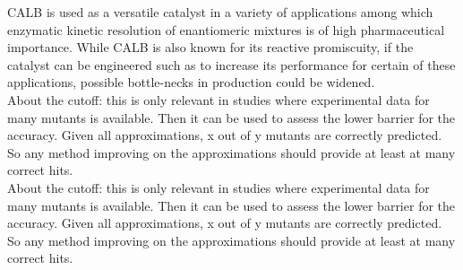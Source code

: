 CALB is used as a versatile catalyst in a variety of applications among which enzymatic kinetic resolution of enantiomeric mixtures is of high pharmaceutical importance\cite{gotor2006candida}.
While CALB is also known for its reactive promiscuity\cite{CBIC:CBIC200800318}, if the catalyst can be engineered such as to increase its performance for certain of these applications, possible bottle-necks in production could be widened.\\
About the cutoff: this is only relevant in studies where experimental data for many mutants is available.
Then it can be used to assess the lower barrier for the accuracy.
Given all approximations, x out of y mutants are correctly predicted.
So any method improving on the approximations should provide at least at many correct hits.\\
About the cutoff: this is only relevant in studies where experimental data for many mutants is available.
Then it can be used to assess the lower barrier for the accuracy.
Given all approximations, x out of y mutants are correctly predicted.
So any method improving on the approximations should provide at least at many correct hits.

